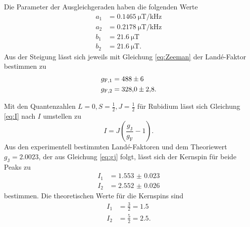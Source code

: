 Die Parameter der Ausgleichgeraden haben die folgenden Werte
\begin{align*}
    a_1 &= \SI{0.1465}{\micro\tesla\per\kilo\hertz} \\
    a_2 &= \SI{0.2178}{\micro\tesla\per\kilo\hertz} \\
    b_1 &= \SI{21.6}{\micro\tesla} \\
    b_2 &= \SI{21.6}{\micro\tesla}.
\end{align*}
Aus der Steigung lässt sich jeweils mit Gleichung \ref{eq:Zeeman} der Landé-Faktor bestimmen zu
\begin{align*}
    g_{\text{F},1} &= \num{488 \pm 6} \\
    g_{\text{F},2} &= \num{328 \pm 2.8}.
\end{align*}

Mit den Quantenzahlen $L = 0, S = \frac{1}{2}, J = \frac{1}{2}$ für Rubidium lässt sich Gleichung \ref{eq:I} nach $I$ umstellen zu
\begin{equation*}
    I = J \left( \frac{g_\text{J}}{g_\text{F}} -1 \right).
\end{equation*} 
Aus den experimentell bestimmten Landé-Faktoren und dem Theoriewert $g_\text{J} = \num{2.0023}$, der aus Gleichung \ref{eq:gj} folgt, lässt sich der Kernspin für beide Peaks zu
\begin{align*}
    I_1 &= \num{1.553(23)} \\
    I_2 &= \num{2.552(26)}
\end{align*}
bestimmen. 
Die theoretischen Werte für die Kernspins sind
\begin{align*}
    I_1 &= \frac{3}{2} = \num{1.5} \\
    I_2 &= \frac{5}{2} = \num{2.5}.
\end{align*}


